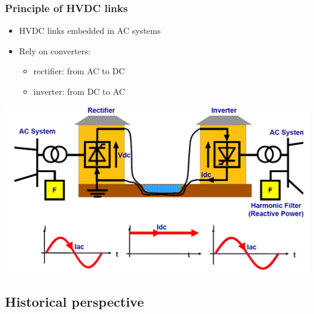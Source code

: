 \begin{frame}
\frametitle{Principle of HVDC links}
\begin{itemize}
    \item HVDC links embedded in AC systems
    \item Rely on converters:
    \begin{itemize}
        \item rectifier: from AC to DC
        \item inverter: from DC to AC
    \end{itemize}
\end{itemize}
\begin{center}
    \includegraphics[width=0.5\linewidth]{images/principlesHVDC.png}
\end{center}
\end{frame}

\subsection{Historical perspective}

